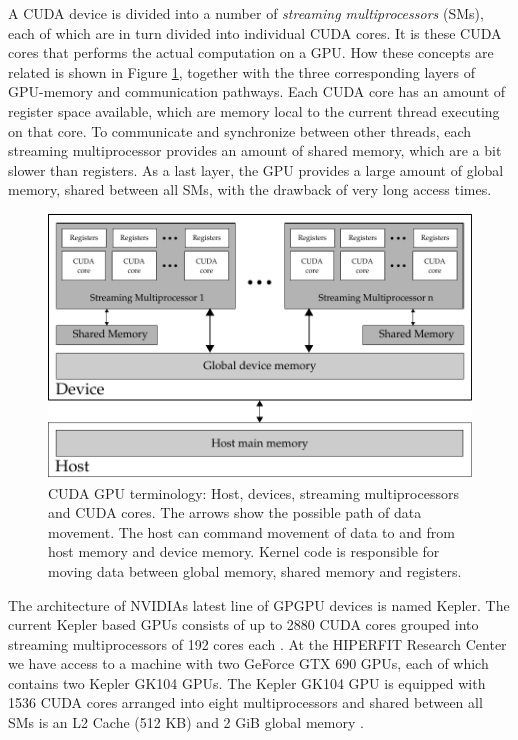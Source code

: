 A CUDA device is divided into a number of \textit{streaming
  multiprocessors} (SMs), each of which are in turn divided into
individual CUDA cores. It is these CUDA cores that performs the actual
computation on a GPU. How these concepts are related is shown in
Figure \ref{fig:gpu_terminology}, together with the three
corresponding layers of GPU-memory and communication pathways. Each
CUDA core has an amount of register space available, which are memory
local to the current thread executing on that core. To communicate and
synchronize between other threads, each streaming multiprocessor
provides an amount of shared memory, which are a bit slower than
registers. As a last layer, the GPU provides a large amount of global
memory, shared between all SMs, with the drawback of very long access
times.

\begin{figure}
  \centering
  \includegraphics[width=\textwidth]{graphics/cuda-structure}
  \caption{CUDA GPU terminology: Host, devices, streaming
    multiprocessors and CUDA cores. The arrows show the possible path
    of data movement. The host can command movement of data to and
    from host memory and device memory. Kernel code is responsible for
    moving data between global memory, shared memory and registers.}
  \label{fig:gpu_terminology}
\end{figure}

The architecture of NVIDIAs latest line of GPGPU devices is named
Kepler. The current Kepler based GPUs consists of up to 2880 CUDA
cores grouped into streaming multiprocessors of 192 cores each
\cite{nvidia2012keplerGK110}. At the HIPERFIT Research Center we have
access to a machine with two GeForce GTX 690 GPUs, each of which
contains two Kepler GK104 GPUs. The Kepler GK104 GPU is equipped with
1536 CUDA cores arranged into eight multiprocessors and shared between
all SMs is an L2 Cache (512 KB) and 2 GiB global memory
\cite{nvidia2012geforcegtx680}.


